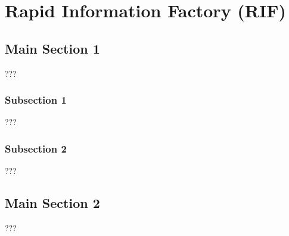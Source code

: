 
\chapter{Rapid Information Factory (RIF)} %

\label{Chapter03} %



\section{Main Section 1}

???

\subsection{Subsection 1}

???


\subsection{Subsection 2}

???


\section{Main Section 2}

???

